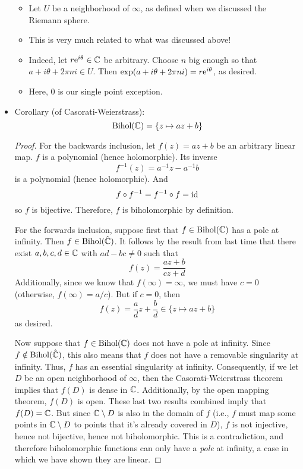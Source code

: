 \documentclass[../notes.tex]{subfiles}
\begin{document}
\begin{itemize}
\begin{itemize}
        \item Let $U$ be a neighborhood of $\infty$, as defined when we discussed the Riemann sphere.
        \item This is very much related to what was discussed above!
        \item Indeed, let $r\e[i\theta]\in\C$ be arbitrary. Choose $n$ big enough so that $a+i\theta+2\pi ni\in U$. Then $\exp(a+i\theta+2\pi ni)=r\e[i\theta]$, as desired.
        \item Here, 0 is our single point exception.
    \end{itemize}
    \item Corollary (of Casorati-Weierstrass):
    \begin{equation*}
        \Bihol(\C) = \{z\mapsto az+b\}
    \end{equation*}
    \begin{proof}
        For the backwards inclusion, let $f(z)=az+b$ be an arbitrary linear map. $f$ is a polynomial (hence holomorphic). Its inverse
        \begin{equation*}
            f^{-1}(z) = a^{-1}z-a^{-1}b
        \end{equation*}
        is a polynomial (hence holomorphic). And
        \begin{equation*}
            f\circ f^{-1} = f^{-1}\circ f = \id
        \end{equation*}
        so $f$ is bijective. Therefore, $f$ is biholomorphic by definition.\par
        For the forwards inclusion, suppose first that $f\in\Bihol(\C)$ has a pole at infinity. Then $f\in\Bihol(\hat{\C})$. It follows by the result from last time that there exist $a,b,c,d\in\C$ with $ad-bc\neq 0$ such that
        \begin{equation*}
            f(z) = \frac{az+b}{cz+d}
        \end{equation*}
        Additionally, since we know that $f(\infty)=\infty$, we must have $c=0$ (otherwise, $f(\infty)=a/c$). But if $c=0$, then
        \begin{equation*}
            f(z) = \frac{a}{d}z+\frac{b}{d} \in \{z\mapsto az+b\}
        \end{equation*}
        as desired.\par
        Now suppose that $f\in\Bihol(\C)$ does not have a pole at infinity. Since $f\notin\Bihol(\hat{\C})$, this also means that $f$ does not have a removable singularity at infinity. Thus, $f$ has an essential singularity at infinity. Consequently, if we let $D$ be an open neighborhood of $\infty$, then the Casorati-Weierstrass theorem implies that $f(D)$ is dense in $\C$. Additionally, by the open mapping theorem, $f(D)$ is open. These last two results combined imply that $f(D)=\C$. But since $\C\setminus D$ is also in the domain of $f$ (i.e., $f$ must map some points in $\C\setminus D$ to points that it's already covered in $D$), $f$ is not injective, hence not bijective, hence not biholomorphic. This is a contradiction, and therefore biholomorphic functions can only have a \emph{pole} at infinity, a case in which we have shown they are linear.

\end{proof}
\end{itemize}
\end{document}
